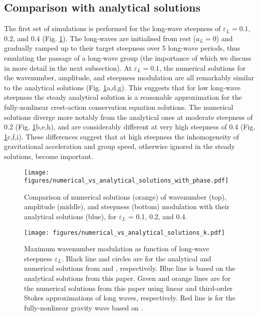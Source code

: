 \documentclass[lineno]{jfm}
\begin{document}
\subsection{Comparison with analytical solutions}
\label{subsection:comparison_with_analytical_solutions}

The first set of simulations is performed for the long-wave steepness of
$\varepsilon_L = 0.1$, $0.2$, and $0.4$ (Fig. \ref{fig:numerical_solutions}).
The long-waves are initialised from rest ($a_L = 0$) and gradually ramped up
to their target steepness over 5 long-wave periods, thus emulating the passage
of a long-wave group
(the importance of which we discuss in more detail in the next subsection).
At $\varepsilon_L = 0.1$, the numerical solutions for the wavenumber, amplitude,
and steepness modulation are all remarkably similar to the analytical solutions
(Fig. \ref{fig:numerical_solutions}a,d,g).
This suggests that for low long-wave steepness the steady analytical solution
is a reasonable approximation for the fully-nonlinear crest-action conservation
equation solutions.
The numerical solutions diverge more notably from the analytical ones at
moderate steepness of 0.2 (Fig. \ref{fig:numerical_solutions}b,e,h), and are
considerably different at very high steepness of 0.4
(Fig. \ref{fig:numerical_solutions}c,f,i).
These differences suggest that at high steepness the inhomogeneity of
gravitational acceleration and group speed, otherwise ignored in the steady
solutions, become important.

\begin{figure}
\centering
\texttt{[image: figures/numerical\_vs\_analytical\_solutions\_with\_phase.pdf]}
\caption{
  Comparison of numerical solutions (orange) of wavenumber (top), amplitude
  (middle), and steepness (bottom) modulation with their analytical solutions
  (blue), for $\varepsilon_L$ = 0.1, 0.2, and 0.4.
}
\label{fig:numerical_solutions}
\end{figure}

\begin{figure}
\centering
\texttt{[image: figures/numerical\_vs\_analytical\_solutions\_k.pdf]}
\caption{
  Maximum wavenumber modulation as function of long-wave steepness $\varepsilon_L$.
  Black line and circles are for the analytical and numerical solutions from
  \citet{longuet1960changes} and \citet{longuet1987propagation}, respectively.
  Blue line is based on the analytical solutions from this paper.
  Green and orange lines are for the numerical solutions from this paper
  using linear and third-order Stokes approximations of long waves, respectively.
  Red line is for the fully-nonlinear gravity wave based on \citet{clamond2018accurate}.
}
\label{fig:numerical_vs_analytical_k}
\end{figure}
\end{document}
